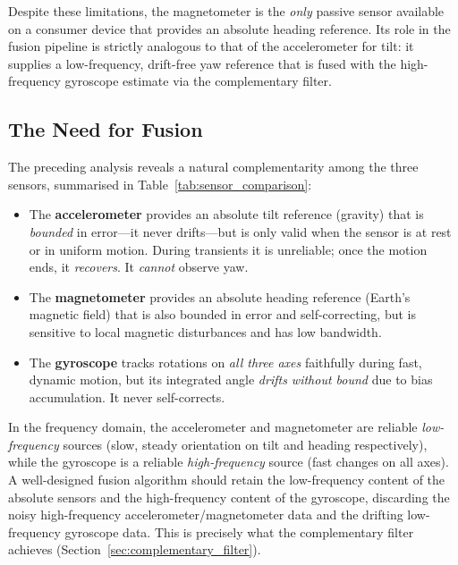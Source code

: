 \noindent Despite these limitations, the magnetometer is the \emph{only}
passive sensor available on a consumer device that provides an absolute
heading reference. Its role in the fusion pipeline is strictly analogous to
that of the accelerometer for tilt: it supplies a low-frequency, drift-free
yaw reference that is fused with the high-frequency gyroscope estimate via
the complementary filter.

\subsection{The Need for Fusion}
\label{sec:frames:fusion_need}

The preceding analysis reveals a natural complementarity among the three
sensors, summarised in Table~\ref{tab:sensor_comparison}:

\begin{itemize}
  \item The \textbf{accelerometer} provides an absolute tilt reference
        (gravity) that is \emph{bounded} in error---it never drifts---but is
        only valid when the sensor is at rest or in uniform motion.
        During transients it is unreliable; once the motion ends, it
        \emph{recovers}. It \emph{cannot} observe yaw.
  \item The \textbf{magnetometer} provides an absolute heading reference
        (Earth's magnetic field) that is also bounded in error and
        self-correcting, but is sensitive to local magnetic disturbances and
        has low bandwidth.
  \item The \textbf{gyroscope} tracks rotations on \emph{all three axes}
        faithfully during fast, dynamic motion, but its integrated angle
        \emph{drifts without bound} due to bias accumulation. It never
        self-corrects.
\end{itemize}

\noindent In the frequency domain, the accelerometer and magnetometer are
reliable \emph{low-frequency} sources (slow, steady orientation on
tilt and heading respectively), while the gyroscope is a reliable
\emph{high-frequency} source (fast changes on all axes). A well-designed
fusion algorithm should retain the low-frequency content of the absolute
sensors and the high-frequency content of the gyroscope, discarding the
noisy high-frequency accelerometer/magnetometer data and the drifting
low-frequency gyroscope data. This is precisely what the complementary
filter achieves (Section~\ref{sec:complementary_filter}).

